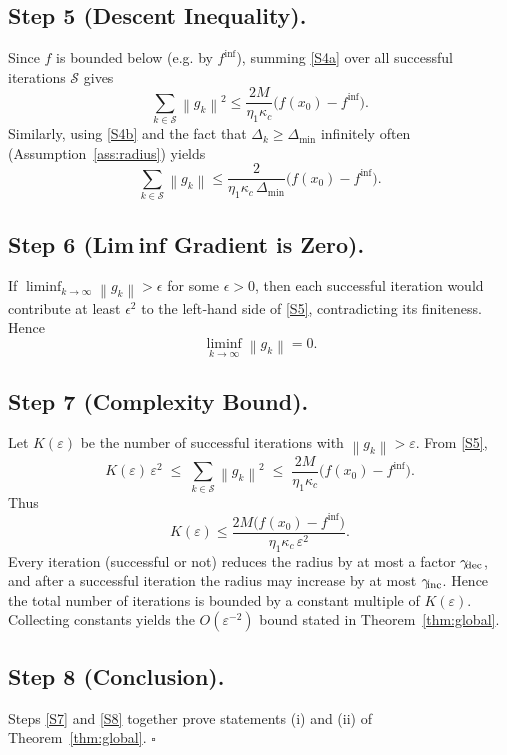 \documentclass{article}
\newcommand{\norm}[1]{\left\lVert #1\right\rVert}
\begin{document}
\subsection*{Step 5 (Descent Inequality).}
Since $f$ is bounded below (e.g. by $f^{\inf}$), summing \eqref{S4a} over all successful iterations $\mathcal{S}$ gives
\[
\sum_{k\in\mathcal{S}}\norm{g_{k}}^{2}
\le \frac{2M}{\eta_{1}\kappa_{\!c}}\bigl(f(x_{0})-f^{\inf}\bigr).
\tag{S5}
\]
Similarly, using \eqref{S4b} and the fact that $\Delta_{k}\ge\Delta_{\min}$ infinitely often (Assumption~\ref{ass:radius}) yields
\[
\sum_{k\in\mathcal{S}}\norm{g_{k}}
\le \frac{2}{\eta_{1}\kappa_{\!c}\,\Delta_{\min}}\bigl(f(x_{0})-f^{\inf}\bigr).
\tag{S6}
\]

\subsection*{Step 6 (Lim inf Gradient is Zero).}
If $\liminf_{k\to\infty}\norm{g_{k}}>\epsilon$ for some $\epsilon>0$, then each successful iteration would contribute at least $\epsilon^{2}$ to the left‑hand side of \eqref{S5}, contradicting its finiteness. Hence
\[
\liminf_{k\to\infty}\norm{g_{k}}=0.
\tag{S7}
\]

\subsection*{Step 7 (Complexity Bound).}
Let $K(\varepsilon)$ be the number of successful iterations with $\norm{g_{k}}>\varepsilon$. From \eqref{S5},
\[
K(\varepsilon)\,\varepsilon^{2}
\;\le\;
\sum_{k\in\mathcal{S}}\norm{g_{k}}^{2}
\;\le\;
\frac{2M}{\eta_{1}\kappa_{\!c}}\bigl(f(x_{0})-f^{\inf}\bigr).
\]
Thus
\[
K(\varepsilon)\le
\frac{2M\bigl(f(x_{0})-f^{\inf}\bigr)}{\eta_{1}\kappa_{\!c}\,\varepsilon^{2}}.
\tag{S8}
\]
Every iteration (successful or not) reduces the radius by at most a factor $\gamma_{\!{\rm dec}}$, and after a successful iteration the radius may increase by at most $\gamma_{\!{\rm inc}}$. Hence the total number of iterations is bounded by a constant multiple of $K(\varepsilon)$. Collecting constants yields the $O(\varepsilon^{-2})$ bound stated in Theorem~\ref{thm:global}.

\subsection*{Step 8 (Conclusion).}
Steps \ref{S7} and \ref{S8} together prove statements (i) and (ii) of Theorem~\ref{thm:global}. $\square$
\end{document}
